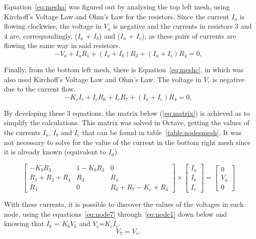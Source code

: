 Equation~\ref{eq:mesha}  was figured out by analysing the top left mesh, using Kirchoff's Voltage Law and Ohm's Law for the resistors. Since the current $I_a$ is flowing clockwise, the voltage in $V_a$ is negative and the currents in resistors 3 and 4 are, 
correspondingly, ($I_a$ + $I_b$) and ($I_a$ + $I_c$), as these pairs of currents are flowing the same way in said resistors.
\begin{equation}
  -V_{a} + I_{a}R_{1} + (I_{a} + I_{b})R_{3} + (I_{a} + I_{c})R_{4} = 0,
  \label{eq:mesha}
\end{equation}

Finally, from the bottom left mesh, there is Equation~\ref{eq:meshc}, in which was also used Kirchoff's Voltage Law and Ohm's Law. The voltage in $V_c$ is negative due to the current flow.
\begin{equation}
  -K_{c}I_{c} + I_{c}R_{6} + I_{c}R_{7} + (I_{a} + I_{c})R_{4} = 0,
  \label{eq:meshc}
\end{equation}
\newpage

By developing these 3 equations, the matrix below (\ref{eq:matrix}) is achieved as to simplify the calculations. This matrix was solved in Octave, getting the values of the currents $I_a$, $I_b$ and $I_c$ that can be found in table~\ref{table:nodesmesh}. It was not necessary to solve for the value of the current in the bottom right mesh since it is already known (equivalent to $I_d$).

\begin{equation}
\left[ \begin{array}{ccc} -K_bR_3 & 1-K_bR_3 & 0 \\ R_1+R_3+R_4 & R_3 & R_4 \\ R_4 & 0 & R_6+R_7-K_c+R_4 \end{array} \right]
\times \left[ \begin{array}{c} I_a \\ I_b \\ I_c \end{array} \right] =
\left[ \begin{array}{c} 0 \\ V_a \\ 0 \end{array} \right]
\label{eq:matrix}
\end{equation}

With these currents, it is possible to discover the values of the voltages in each node, using the equations~\ref{eq:node7} through~\ref{eq:node1} down below and knowing that $I_b$ = $K_b$$V_b$ and $V_c$=$K_c$$I_c$.
\begin{equation}
  V_{7} = V_{c},
  \label{eq:node7}
\end{equation}

